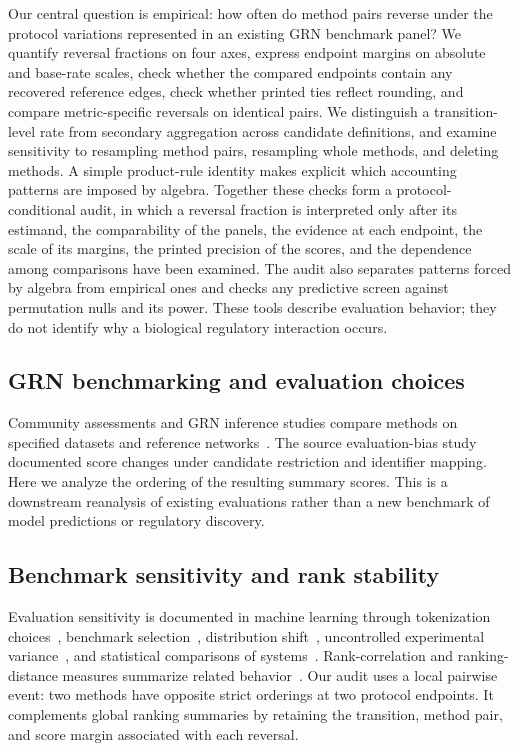 \documentclass[10pt,letterpaper]{article}
\begin{document}
Our central question is empirical: how often do method pairs reverse under the protocol variations represented in an existing GRN benchmark panel? We quantify reversal fractions on four axes, express endpoint margins on absolute and base-rate scales, check whether the compared endpoints contain any recovered reference edges, check whether printed ties reflect rounding, and compare metric-specific reversals on identical pairs. We distinguish a transition-level rate from secondary aggregation across candidate definitions, and examine sensitivity to resampling method pairs, resampling whole methods, and deleting methods. A simple product-rule identity makes explicit which accounting patterns are imposed by algebra. Together these checks form a protocol-conditional audit, in which a reversal fraction is interpreted only after its estimand, the comparability of the panels, the evidence at each endpoint, the scale of its margins, the printed precision of the scores, and the dependence among comparisons have been examined. The audit also separates patterns forced by algebra from empirical ones and checks any predictive screen against permutation nulls and its power. These tools describe evaluation behavior; they do not identify why a biological regulatory interaction occurs.

\subsection*{GRN benchmarking and evaluation choices}
Community assessments and GRN inference studies compare methods on specified datasets and reference networks~\cite{pratapa2020beeline,aibar2017scenic,huynhthu2010genie3,marbach2012wisdom,stolovitzky2007dream}. The source evaluation-bias study~\cite{kendiukhov2026evalrelease} documented score changes under candidate restriction and identifier mapping. Here we analyze the ordering of the resulting summary scores. This is a downstream reanalysis of existing evaluations rather than a new benchmark of model predictions or regulatory discovery.

\subsection*{Benchmark sensitivity and rank stability}
Evaluation sensitivity is documented in machine learning through tokenization choices~\cite{post2018bleu}, benchmark selection~\cite{dehghani2021lottery}, distribution shift~\cite{recht2019imagenet}, uncontrolled experimental variance~\cite{bouthillier2021variance}, and statistical comparisons of systems~\cite{dror2018hitchhiker,demsar2006statistical}. Rank-correlation and ranking-distance measures summarize related behavior~\cite{kendall1938tau,critchlow1985metric}. Our audit uses a local pairwise event: two methods have opposite strict orderings at two protocol endpoints. It complements global ranking summaries by retaining the transition, method pair, and score margin associated with each reversal.
\end{document}
